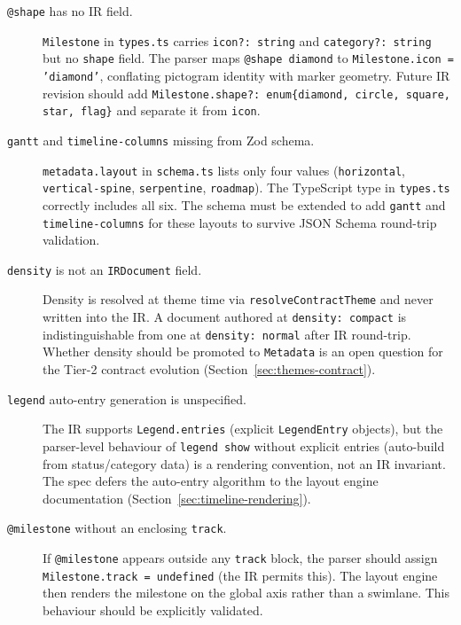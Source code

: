\begin{description}
  \item[\texttt{@shape} has no IR field.]
        \texttt{Milestone} in \texttt{types.ts} carries \texttt{icon?:
        string} and \texttt{category?: string} but no \texttt{shape} field.
        The parser maps \texttt{@shape diamond} to \texttt{Milestone.icon =
        'diamond'}, conflating pictogram identity with marker geometry.
        Future IR revision should add \texttt{Milestone.shape?: enum\{diamond,
        circle, square, star, flag\}} and separate it from \texttt{icon}.

  \item[\texttt{gantt} and \texttt{timeline-columns} missing from Zod schema.]
        \texttt{metadata.layout} in \texttt{schema.ts} lists only four values
        (\texttt{horizontal}, \texttt{vertical-spine}, \texttt{serpentine},
        \texttt{roadmap}).  The TypeScript type in \texttt{types.ts} correctly
        includes all six.  The schema must be extended to add \texttt{gantt}
        and \texttt{timeline-columns} for these layouts to survive
        JSON Schema round-trip validation.

  \item[\texttt{density} is not an \texttt{IRDocument} field.]
        Density is resolved at theme time via \texttt{resolveContractTheme}
        and never written into the IR.  A document authored at
        \texttt{density: compact} is indistinguishable from one at
        \texttt{density: normal} after IR round-trip.  Whether density should
        be promoted to \texttt{Metadata} is an open question for the Tier-2
        contract evolution (Section~\ref{sec:themes-contract}).

  \item[\texttt{legend} auto-entry generation is unspecified.]
        The IR supports \texttt{Legend.entries} (explicit \texttt{LegendEntry}
        objects), but the parser-level behaviour of \texttt{legend show}
        without explicit entries (auto-build from status/category data) is a
        rendering convention, not an IR invariant.  The spec defers the
        auto-entry algorithm to the layout engine documentation
        (Section~\ref{sec:timeline-rendering}).

  \item[\texttt{@milestone} without an enclosing \texttt{track}.]
        If \texttt{@milestone} appears outside any \texttt{track} block, the
        parser should assign \texttt{Milestone.track = undefined} (the IR
        permits this).  The layout engine then renders the milestone on the
        global axis rather than a swimlane.  This behaviour should be
        explicitly validated.
\end{description}
